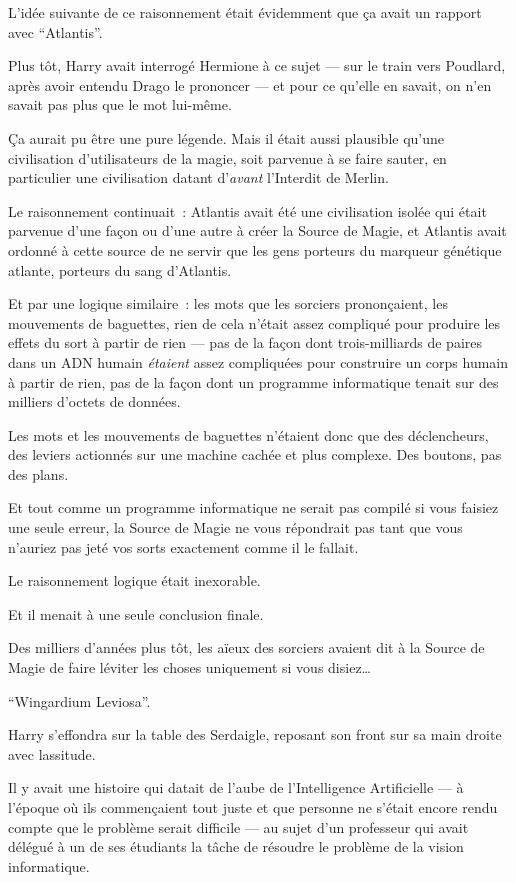 L'idée suivante de ce raisonnement était évidemment que ça avait un rapport avec “Atlantis”.

Plus tôt, Harry avait interrogé Hermione à ce sujet — sur le train vers Poudlard, après avoir entendu Drago le prononcer — et pour ce qu'elle en savait, on n'en savait pas plus que le mot lui-même.

Ça aurait pu être une pure légende. Mais il était aussi plausible qu'une civilisation d'utilisateurs de la magie, soit parvenue à se faire sauter, en particulier une civilisation datant d'\emph{avant} l'Interdit de Merlin.

Le raisonnement continuait~: Atlantis avait été une civilisation isolée qui était parvenue d'une façon ou d'une autre à créer la Source de Magie, et Atlantis avait ordonné à cette source de ne servir que les gens porteurs du marqueur génétique atlante, porteurs du sang d'Atlantis.

Et par une logique similaire~: les mots que les sorciers prononçaient, les mouvements de baguettes, rien de cela n'était assez compliqué pour produire les effets du sort à partir de rien — pas de la façon dont trois-milliards de paires dans un ADN humain \emph{étaient} assez compliquées pour construire un corps humain à partir de rien, pas de la façon dont un programme informatique tenait sur des milliers d'octets de données.

Les mots et les mouvements de baguettes n'étaient donc que des déclencheurs, des leviers actionnés sur une machine cachée et plus complexe. Des boutons, pas des plans.

Et tout comme un programme informatique ne serait pas compilé si vous faisiez une seule erreur, la Source de Magie ne vous répondrait pas tant que vous n'auriez pas jeté vos sorts exactement comme il le fallait.

Le raisonnement logique était inexorable.

Et il menait à une seule conclusion finale.

Des milliers d'années plus tôt, les aïeux des sorciers avaient dit à la Source de Magie de faire léviter les choses uniquement si vous disiez…

“Wingardium Leviosa”.

Harry s'effondra sur la table des Serdaigle, reposant son front sur sa main droite avec lassitude.

Il y avait une histoire qui datait de l'aube de l'Intelligence Artificielle — à l'époque où ils commençaient tout juste et que personne ne s'était encore rendu compte que le problème serait difficile — au sujet d'un professeur qui avait délégué à un de ses étudiants la tâche de résoudre le problème de la vision informatique.

